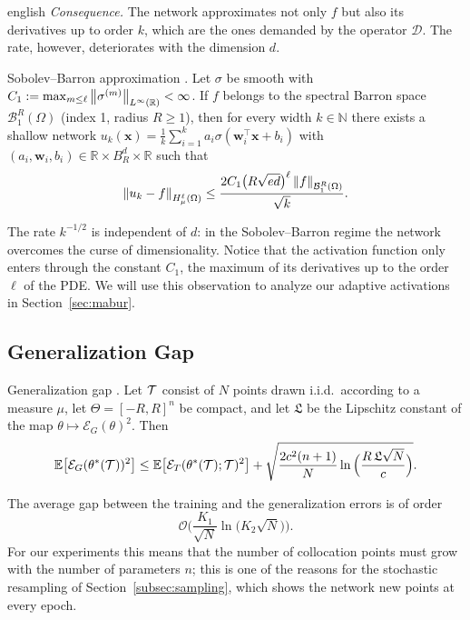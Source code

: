 \documentclass[../0000.tex]{subfiles}
\begin{document}
\begin{hyphenrules}{english}
\emph{Consequence.} The network approximates not only $f$ but also its derivatives up to order $k$, which
are the ones demanded by the operator $\mathcal{D}$. The rate, however, deteriorates with the dimension
$d$.

\begin{teorema}{Sobolev--Barron approximation \cite[Theorem~4.33]{deryck2024acta}.}\label{thm:barron}
Let $\sigma$ be smooth with $C_1:=\max_{m\le\ell}\left\lVert \sigma^{(m)} \right\rVert_{L^\infty(\mathbb{R})}<\infty$. If $f$
belongs to the spectral Barron space $\mathcal{B}^{R}_{1}(\Omega)$ (index 1, radius $R\ge1$), then for
every width $k\in\mathbb{N}$ there exists a shallow network
$u_k(\mathbf{x})=\frac1k\sum_{i=1}^{k}a_i\sigma(\mathbf{w}_i^{\top}\mathbf{x}+b_i)$ with
$(a_i,\mathbf{w}_i,b_i)\in\mathbb{R}\times B^d_R\times\mathbb{R}$ such that
\[
  \left\lVert u_k-f \right\rVert_{H^{\ell}_{\mu}(\Omega)}\le\frac{2C_1\big(R\sqrt{ed}\big)^{\ell}\left\lVert f \right\rVert_{\mathcal{B}^R_1(\Omega)}}{\sqrt{k}}.
\]
\end{teorema}

The rate $k^{-1/2}$ is independent of $d$: in the Sobolev--Barron regime the network overcomes the
curse of dimensionality. Notice that the activation function only enters through the constant $C_1$,
the maximum of its derivatives up to the order $\ell$ of the PDE. We will use this observation to
analyze our adaptive activations in Section~\ref{sec:mabur}.

\subsection{Generalization Gap}

\begin{teorema}{Generalization gap \cite[Theorem~6.2]{deryck2022kolmogorov,beck2022}.}\label{thm:generalization}
Let $\mathcal{T}$ consist of $N$ points drawn i.i.d.\ according to a measure $\mu$, let $\Theta=[-R,R]^{n}$ be
compact, and let $\mathfrak{L}$ be the Lipschitz constant of the map $\theta\mapsto\mathcal{E}_G(\theta)^2$.
Then
\[
  \mathbb{E}\big[\mathcal{E}_G(\theta^{*}(\mathcal{T}))^2\big]\le\mathbb{E}\big[\mathcal{E}_T(\theta^{*}(\mathcal{T});\mathcal{T})^2\big]
  +\sqrt{\frac{2c^2(n+1)}{N}\ln\Big(\frac{R\,\mathfrak{L}\sqrt{N}}{c}\Big)}.
\]
\end{teorema}

The average gap between the training and the generalization errors is of order
\[
  \mathcal{O}\Big(\frac{K_1}{\sqrt N}\ln\big(K_2\sqrt N\big)\Big).
\] For our experiments this means that the number
of collocation points must grow with the number of parameters $n$; this is one of the reasons for the
stochastic resampling of Section~\ref{subsec:sampling}, which shows the network new points at every epoch.


\end{hyphenrules}
\end{document}
